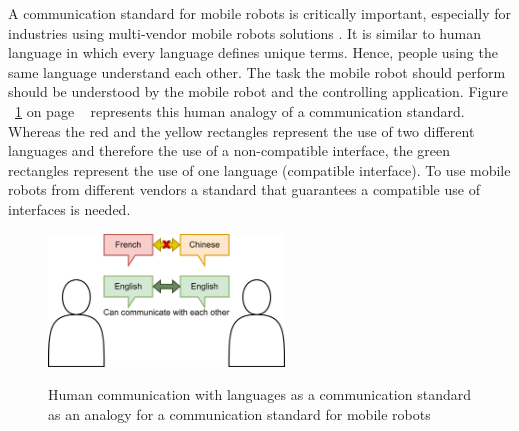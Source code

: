 A communication standard for mobile robots is critically important, especially for industries using multi-vendor mobile robots solutions \cite{nayyar_challenges_2020}. It is similar to human language in which every language defines unique terms. Hence, people using the same language understand each other. The task the mobile robot should perform should be understood by the mobile robot and the controlling application. Figure ~\ref{fig:introduction__humanstandard} on page ~\pageref{fig:introduction__humanstandard} represents this human analogy of a communication standard. Whereas the red and the yellow rectangles represent the use of two different languages and therefore the use of a non-compatible interface, the green rectangles represent the use of one language (compatible interface). To use mobile robots from different vendors a standard that guarantees a compatible use of interfaces is needed.

\begin{figure}[!ht]
	\centering
	\includegraphics[width=0.56\textwidth]{images/CommunicationStandard.png}\\
	\caption[Compact Routing Example]%
          {Human communication with languages as a communication standard as an analogy for a communication standard for mobile robots}
	\label{fig:introduction__humanstandard}
\end{figure}

